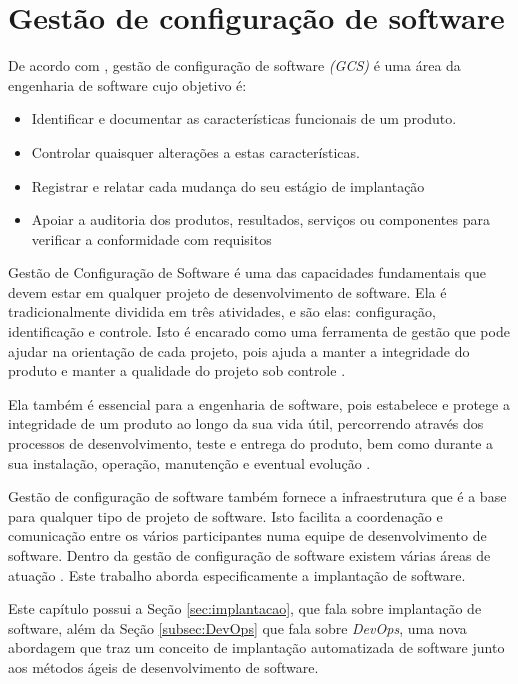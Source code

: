 \chapter{Gestão de configuração de software}
\label{cap-referencial}

De acordo com , gestão de configuração de software \textit{(GCS)} 
é uma área da engenharia de software cujo objetivo é:

\begin{itemize}
  \item Identificar e documentar as características funcionais de
  um produto.
  \item Controlar quaisquer alterações a estas características.
  \item Registrar e relatar cada mudança do seu estágio de implantação
  \item Apoiar a auditoria dos produtos, resultados, serviços ou
componentes para verificar a conformidade com requisitos

\end{itemize}

Gestão de Configuração de Software é uma das capacidades fundamentais que devem
estar em qualquer projeto de desenvolvimento de software. Ela é
tradicionalmente dividida em três atividades, e são elas: configuração,
identificação e controle. Isto é encarado como uma ferramenta de
gestão que pode ajudar na orientação de cada projeto, pois ajuda a manter a
integridade do produto e manter a qualidade do projeto sob controle \cite{gcs}. 

Ela também é essencial para a engenharia de software, pois estabelece e protege a
integridade de um produto ao longo da sua vida útil, percorrendo através dos
processos de desenvolvimento, teste e entrega do produto, bem como
durante a sua instalação, operação, manutenção e eventual evolução \cite{ieegcs}.

Gestão de configuração de software também fornece a infraestrutura que é a base para
qualquer tipo de projeto de software. Isto facilita a coordenação e comunicação
entre os vários participantes numa equipe de desenvolvimento de software.
Dentro da gestão de configuração de software
existem várias áreas de atuação \cite{gcs}. Este trabalho aborda especificamente a 
implantação de software.

Este capítulo possui a Seção \ref{sec:implantacao}, que fala sobre
implantação de software, além da Seção \ref{subsec:DevOps} que fala sobre 
\textit{DevOps}, uma
nova abordagem que traz um conceito de implantação
automatizada de software junto aos métodos ágeis de desenvolvimento de software. 

